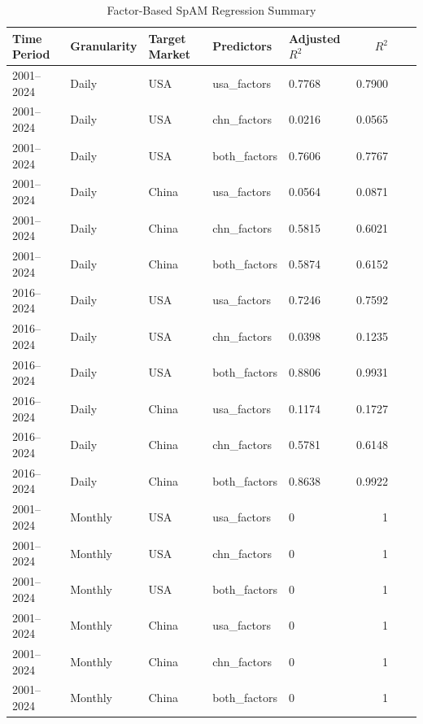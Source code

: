 \begin{table}[htbp]
\centering
\caption{Factor-Based SpAM Regression Summary}
\label{tab:spam_factors_summary_daily}
\begin{tabular}{@{}lllllrrr@{}}
\toprule
Time Period & Granularity & Target Market & Predictors     & Adjusted $R^2$ & $R^2$ \\ \midrule
2001--2024  & Daily       & USA           & usa\_factors   & 0.7768         & 0.7900 \\
2001--2024  & Daily       & USA           & chn\_factors   & 0.0216         & 0.0565 \\
2001--2024  & Daily       & USA           & both\_factors  & 0.7606         & 0.7767 \\
2001--2024  & Daily       & China         & usa\_factors   & 0.0564         & 0.0871 \\
2001--2024  & Daily       & China         & chn\_factors   & 0.5815         & 0.6021 \\
2001--2024  & Daily       & China         & both\_factors  & 0.5874         & 0.6152 \\
2016--2024  & Daily       & USA           & usa\_factors   & 0.7246         & 0.7592 \\
2016--2024  & Daily       & USA           & chn\_factors   & 0.0398         & 0.1235 \\
2016--2024  & Daily       & USA           & both\_factors  & 0.8806         & 0.9931 \\
2016--2024  & Daily       & China         & usa\_factors   & 0.1174         & 0.1727 \\
2016--2024  & Daily       & China         & chn\_factors   & 0.5781         & 0.6148 \\
2016--2024  & Daily       & China         & both\_factors  & 0.8638         & 0.9922 \\
2001--2024  & Monthly     & USA           & usa\_factors   & 0         & 1 \\
2001--2024  & Monthly     & USA           & chn\_factors   & 0         & 1 \\
2001--2024  & Monthly     & USA           & both\_factors  & 0         & 1 \\
2001--2024  & Monthly     & China         & usa\_factors   & 0         & 1 \\
2001--2024  & Monthly     & China         & chn\_factors   & 0         & 1 \\
2001--2024  & Monthly     & China         & both\_factors  & 0         & 1 \\

\end{tabular}
\end{table}
